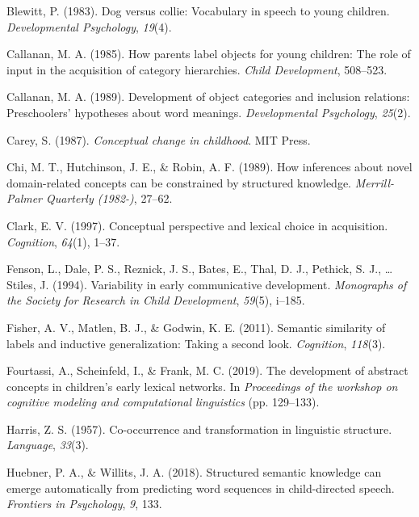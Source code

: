 \documentclass[english,,man,floatsintext]{apa6}
\begin{document}
\leavevmode\hypertarget{ref-blewitt1983}{}%
Blewitt, P. (1983). Dog versus collie: Vocabulary in speech to young children. \emph{Developmental Psychology}, \emph{19}(4).

\leavevmode\hypertarget{ref-callanan1985}{}%
Callanan, M. A. (1985). How parents label objects for young children: The role of input in the acquisition of category hierarchies. \emph{Child Development}, 508--523.

\leavevmode\hypertarget{ref-callanan1989}{}%
Callanan, M. A. (1989). Development of object categories and inclusion relations: Preschoolers' hypotheses about word meanings. \emph{Developmental Psychology}, \emph{25}(2).

\leavevmode\hypertarget{ref-carey1987}{}%
Carey, S. (1987). \emph{Conceptual change in childhood}. MIT Press.

\leavevmode\hypertarget{ref-chi1989}{}%
Chi, M. T., Hutchinson, J. E., \& Robin, A. F. (1989). How inferences about novel domain-related concepts can be constrained by structured knowledge. \emph{Merrill-Palmer Quarterly (1982-)}, 27--62.

\leavevmode\hypertarget{ref-clark1997}{}%
Clark, E. V. (1997). Conceptual perspective and lexical choice in acquisition. \emph{Cognition}, \emph{64}(1), 1--37.

\leavevmode\hypertarget{ref-fenson94}{}%
Fenson, L., Dale, P. S., Reznick, J. S., Bates, E., Thal, D. J., Pethick, S. J., \ldots{} Stiles, J. (1994). Variability in early communicative development. \emph{Monographs of the Society for Research in Child Development}, \emph{59}(5), i--185.

\leavevmode\hypertarget{ref-fisher2011}{}%
Fisher, A. V., Matlen, B. J., \& Godwin, K. E. (2011). Semantic similarity of labels and inductive generalization: Taking a second look. \emph{Cognition}, \emph{118}(3).

\leavevmode\hypertarget{ref-fourtassi2019}{}%
Fourtassi, A., Scheinfeld, I., \& Frank, M. C. (2019). The development of abstract concepts in children's early lexical networks. In \emph{Proceedings of the workshop on cognitive modeling and computational linguistics} (pp. 129--133).

\leavevmode\hypertarget{ref-harris1957}{}%
Harris, Z. S. (1957). Co-occurrence and transformation in linguistic structure. \emph{Language}, \emph{33}(3).

\leavevmode\hypertarget{ref-huebner2018}{}%
Huebner, P. A., \& Willits, J. A. (2018). Structured semantic knowledge can emerge automatically from predicting word sequences in child-directed speech. \emph{Frontiers in Psychology}, \emph{9}, 133.
\end{document}
